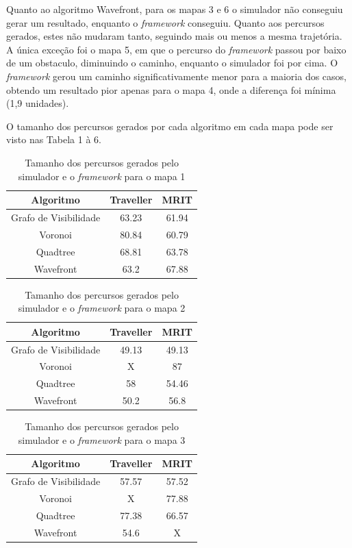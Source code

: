 Quanto ao algoritmo Wavefront, para os mapas 3 e 6 o simulador não conseguiu gerar um resultado, enquanto o \textit{framework} conseguiu. Quanto aos percursos gerados,
estes não mudaram tanto, seguindo mais ou menos a mesma trajetória. A única exceção foi o mapa 5, em que o percurso do \textit{framework} passou por baixo de um obstaculo, diminuindo o caminho, enquanto o simulador foi por cima. O \textit{framework} gerou um caminho significativamente menor para a maioria dos casos, obtendo um resultado pior apenas para o mapa 4, onde a diferença foi mínima (1,9 unidades).

O tamanho dos percursos gerados por cada algoritmo em cada mapa pode ser visto nas Tabela 1 à 6.

\begin{table}[h]
	\centering
	\label{tab01}
	\begin{tabular}{ccc}
		\toprule
		\textbf{Algoritmo} & \textbf{Traveller} & \textbf{MRIT} \\
		\midrule
Grafo de Visibilidade & 63.23   & 61.94 \\
Voronoi 				  & 80.84   & 60.79 \\
Quadtree				  & 68.81   & 63.78 \\
Wavefront             & 63.2    & 67.88  \\
		\bottomrule
	\end{tabular}
	\caption{Tamanho dos percursos gerados pelo simulador e o \textit{framework} para o mapa 1}
\end{table}

\begin{table}[H]
	\centering
	\label{tab02}
	\begin{tabular}{ccc}
		\toprule
		\textbf{Algoritmo} & \textbf{Traveller} & \textbf{MRIT} \\
		\midrule
Grafo de Visibilidade & 49.13   & 49.13 \\
Voronoi 				  & X       & 87 \\
Quadtree				  & 58      & 54.46 \\
Wavefront             & 50.2    & 56.8  \\
		\bottomrule
	\end{tabular}
	\caption{Tamanho dos percursos gerados pelo simulador e o \textit{framework} para o mapa 2}
\end{table}

\begin{table}[H]
	\centering
	\label{tab03}
	\begin{tabular}{ccc}
		\toprule
		\textbf{Algoritmo} & \textbf{Traveller} & \textbf{MRIT} \\
		\midrule
Grafo de Visibilidade & 57.57   & 57.52 \\
Voronoi 				  & X   		& 77.88 \\
Quadtree				  & 77.38   & 66.57 \\
Wavefront             & 54.6    & X  \\
		\bottomrule
	\end{tabular}
	\caption{Tamanho dos percursos gerados pelo simulador e o \textit{framework} para o mapa 3}
\end{table}


